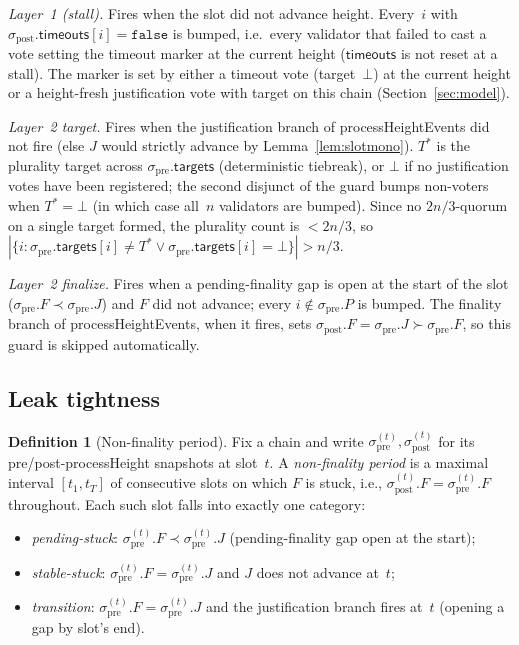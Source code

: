 \ifx\litemode\undefined\documentclass{article}\fi
\newcommand{\targets}{\mathsf{targets}}
\newcommand{\timeouts}{\mathsf{timeouts}}
\newcommand{\processHeight}{\textsf{processHeight}\xspace}
\newcommand{\processHeightEvents}{\textsf{processHeightEvents}\xspace}
\theoremstyle{plain}
\theoremstyle{definition}
\newtheorem{definition}{Definition}
\theoremstyle{remark}
\begin{document}
\emph{Layer~1 (stall).} Fires when the slot did not advance height.
Every~$i$ with $\sigma_{\mathrm{post}}.\timeouts[i] = \mathtt{false}$ is bumped, i.e.\ every validator that failed to cast a vote setting the timeout marker at the current height ($\timeouts$ is not reset at a stall).
The marker is set by either a timeout vote (target~$\bot$) at the current height or a height-fresh justification vote with target on this chain (Section~\ref{sec:model}).

\emph{Layer~2 target.} Fires when the justification branch of \processHeightEvents did not fire (else $J$ would strictly advance by Lemma~\ref{lem:slotmono}).
$T^*$ is the plurality target across $\sigma_{\mathrm{pre}}.\targets$ (deterministic tiebreak), or $\bot$ if no justification votes have been registered; the second disjunct of the guard bumps non-voters when $T^* = \bot$ (in which case all~$n$ validators are bumped).
Since no $2n/3$-quorum on a single target formed, the plurality count is $< 2n/3$, so $|\{i : \sigma_{\mathrm{pre}}.\targets[i] \neq T^* \vee \sigma_{\mathrm{pre}}.\targets[i] = \bot\}| > n/3$.

\emph{Layer~2 finalize.} Fires when a pending-finality gap is open at the start of the slot ($\sigma_{\mathrm{pre}}.F \prec \sigma_{\mathrm{pre}}.J$) and $F$ did not advance; every $i \notin \sigma_{\mathrm{pre}}.P$ is bumped.
The finality branch of \processHeightEvents, when it fires, sets $\sigma_{\mathrm{post}}.F = \sigma_{\mathrm{pre}}.J \succ \sigma_{\mathrm{pre}}.F$, so this guard is skipped automatically.

\subsection{Leak tightness}

\begin{definition}[Non-finality period]\label{def:non-finality-period}
Fix a chain and write $\sigma_{\mathrm{pre}}^{(t)}, \sigma_{\mathrm{post}}^{(t)}$ for its pre/post-\processHeight snapshots at slot~$t$.
A \emph{non-finality period} is a maximal interval $[t_1, t_T]$ of consecutive slots on which $F$ is stuck, i.e., $\sigma_{\mathrm{post}}^{(t)}.F = \sigma_{\mathrm{pre}}^{(t)}.F$ throughout.
Each such slot falls into exactly one category:
\begin{itemize}
  \item \emph{pending-stuck}: $\sigma_{\mathrm{pre}}^{(t)}.F \prec \sigma_{\mathrm{pre}}^{(t)}.J$ (pending-finality gap open at the start);
  \item \emph{stable-stuck}: $\sigma_{\mathrm{pre}}^{(t)}.F = \sigma_{\mathrm{pre}}^{(t)}.J$ and $J$ does not advance at~$t$;
  \item \emph{transition}: $\sigma_{\mathrm{pre}}^{(t)}.F = \sigma_{\mathrm{pre}}^{(t)}.J$ and the justification branch fires at~$t$ (opening a gap by slot's end).
\end{itemize}
\end{definition}
\end{document}
